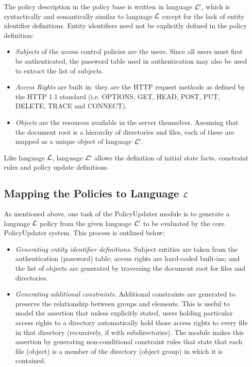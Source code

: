 \documentclass[global,twocolumn,final]{svjour}
\begin{document}
      The policy description in the policy base is written in language
      ${\cal L'}$, which is syntactically and semantically similar to
      language ${\cal L}$ except for the lack of entity identifier
      definitions. Entity identifiers need not be explicitly defined in
      the policy definition:

      \begin{itemize}
        \item
          {\em Subjects} of the access control policies are the users. Since
          all users must first be authenticated, the password table used
          in authentication may also be used to extract the list of subjects.
        \item
          {\em Access Rights} are built in: they are the HTTP request methods
          as defined by the HTTP 1.1 standard \cite{HTTP1} (i.e. OPTIONS, GET,
          HEAD, POST, PUT, DELETE, TRACE and CONNECT).
        \item
          {\em Objects} are the resources available in the server themselves.
          Assuming that the document root is a hierarchy of directories and
          files, each of these are mapped as a unique object of language
          ${\cal L'}$.
      \end{itemize}

      Like language ${\cal L}$, language ${\cal L'}$ allows the definition of
      initial state facts, constraint rules and policy update definitions.

    \subsection{Mapping the Policies to Language ${\cal L}$}

      As mentioned above, one task of the PolicyUpdater module is to generate
      a language ${\cal L}$ policy from the given language ${\cal L'}$ to be
      evaluated by the core PolicyUpdater system. This process is outlined
      below:

      \begin{itemize}
        \item
          {\em Generating entity identifier definitions.} Subject entities are
          taken from the authentication (password) table; access rights are
          hard-coded built-ins; and the list of objects are generated by
          traversing the document root for files and directories.
        \item
          {\em Generating additional constraints.} Additional constraints are
          generated to preserve the relationship between groups and elements.
          This is useful to model the assertion that unless explicitly stated,
          users holding particular access rights to a directory automatically
          hold those access rights to every file in that directory
          (recursively, if with subdirectories). The module makes this
          assertion by generating non-conditional constraint rules that state
          that each file (object) is a member of the directory (object group)
          in which it is contained.
      \end{itemize}
\end{document}
